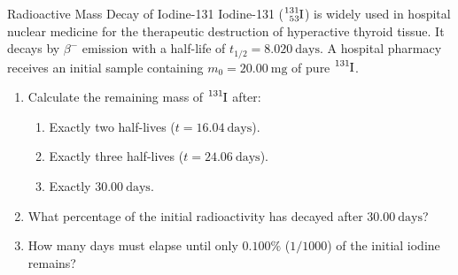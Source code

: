 \begin{exercise}{Radioactive Mass Decay of Iodine-131}
Iodine-131 ($\ce{^{131}_{53}I}$) is widely used in hospital nuclear medicine for the therapeutic destruction of hyperactive thyroid tissue. It decays by $\beta^-$ emission with a half-life of $t_{1/2} = 8.020\ \mathrm{days}$. A hospital pharmacy receives an initial sample containing $m_0 = 20.00\ \mathrm{mg}$ of pure $\ce{^{131}I}$.
\begin{enumerate}[leftmargin=1.5em,itemsep=2pt]
  \item Calculate the remaining mass of $\ce{^{131}I}$ after:
  \begin{enumerate}[leftmargin=1.2em,itemsep=1pt]
    \item Exactly two half-lives ($t = 16.04\ \mathrm{days}$).
    \item Exactly three half-lives ($t = 24.06\ \mathrm{days}$).
    \item Exactly $30.00\ \mathrm{days}$.
  \end{enumerate}
  \item What percentage of the initial radioactivity has decayed after $30.00\ \mathrm{days}$?
  \item How many days must elapse until only $0.100\%$ ($1/1000$) of the initial iodine remains?
\end{enumerate}
\end{exercise}

\begin{tabletworkspace}[5.0cm]
\end{tabletworkspace}

